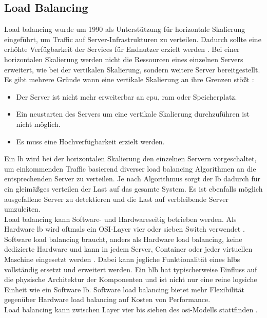 \subsection{Load Balancing} \label{s:load-balancing}
Load balancing wurde um 1990 als Unterstützung für horizontale Skalierung eingeführt, um Traffic auf Server-Infrastrukturen zu verteilen. Dadurch sollte eine erhöhte Verfügbarkeit der Services für Endnutzer erzielt werden \cite{LoadBalancing101}.
Bei einer horizontalen Skalierung werden nicht die Ressourcen eines einzelnen Servers erweitert, wie bei der vertikalen Skalierung, sondern weitere Server bereitgestellt. Es gibt mehrere Gründe wann eine vertikale Skalierung an ihre Grenzen stö{\ss}t \cite{bourkeServerLoadBalancing2001}:
\begin{itemize}
    \item Der Server ist nicht mehr erweiterbar an \acs{cpu}, \acs{ram} oder Speicherplatz.
    \item Ein neustarten des Servers um eine vertikale Skalierung durchzuführen ist nicht möglich.
    \item Es muss eine Hochverfügbarkeit erzielt werden.
\end{itemize}
Ein \acl{lb} wird bei der horizontalen Skalierung den einzelnen Servern vorgeschaltet, um einkommenden Traffic basierend diverser load balancing Algorithmen an die entsprechenden Server zu verteilen.
Je nach Algorithmus sorgt der \ac{lb} dadurch für ein gleimä{\ss}ges verteilen der Last auf das gesamte System. Es ist ebenfalls möglich ausgefallene Server zu detektieren und die Last auf verbleibende Server umzuleiten.
\cite{LoadBalancing101}
\\
Load balancing kann Software- und Hardwareseitig betrieben werden. Als Hardware \ac{lb} wird oftmals ein OSI-Layer vier oder sieben Switch verwendet \cite{WasIstLoad2016}.
Software load balancing braucht, anders als Hardware load balancing, keine dedizierte Hardware und kann in jedem Server, Container oder jeder virtuellen Maschine eingesetzt werden \cite{SoftwareLoadBalancing}.
Dabei kann jegliche Funktionalität eines \acp{hlb} vollständig ersetzt und erweitert werden.
Ein \ac{hlb} hat typischerweise Einfluss auf die physische Architektur der Komponenten und ist nicht nur eine reine logsiche Einheit wie ein Software \ac{lb}.
Software load balancing bietet mehr Flexibilität gegenüber Hardware load balancing auf Kosten von Performance.
\cite{WhatLoadBalancer}
\\
Load balancing kann zwischen Layer vier bis sieben des \ac{osi}-Modells stattfinden \cite{WhatLoadBalancer}.
